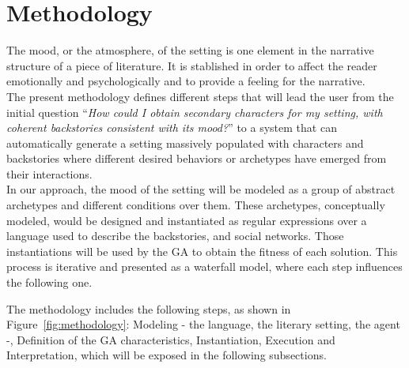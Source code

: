 \documentclass{sig-alternate}
\begin{document}

%
%

\section{Methodology}
\label{sec:methodology}

The mood, or the atmosphere, of the setting is one element in the narrative structure of a piece of literature. It is stablished in order to affect the reader emotionally and psychologically and to provide a feeling for the narrative.
\\

The present methodology defines different steps that will lead the user from the initial question ``\textit{How could I obtain secondary characters for my setting, with coherent backstories consistent with its mood?}'' to a system that can automatically generate a setting massively populated with characters and backstories where different desired behaviors or archetypes have emerged from their interactions.\\

In our approach, the mood of the setting will be modeled as a group of abstract archetypes and different conditions over them. These archetypes, conceptually modeled, would be designed and instantiated as regular expressions over a language used to describe the backstories, and social networks. Those instantiations will be used by the GA to obtain the fitness of each solution. This process is iterative and presented as a waterfall model, where each step influences the following one.

The methodology includes the following steps, as shown in Figure~\ref{fig:methodology}: Modeling - the language, the literary setting, the agent -, Definition of the GA characteristics, Instantiation, Execution and Interpretation, which will be exposed in the following subsections.
\end{document}
